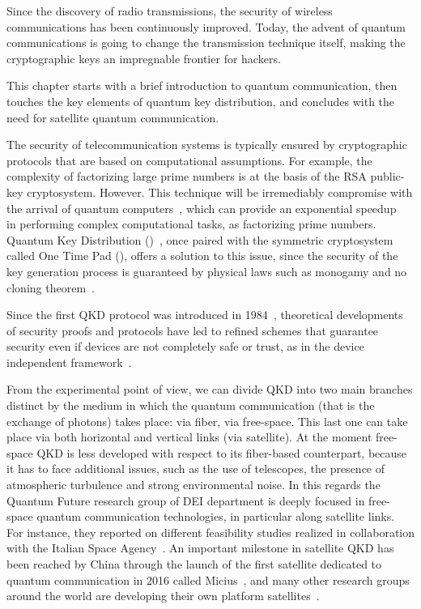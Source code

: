 
Since the discovery of radio transmissions, the security of wireless communications has been continuously improved. Today, the advent of quantum communications is going to change the transmission technique itself, making the cryptographic keys an impregnable frontier for hackers.

This chapter starts with a brief introduction to quantum communication, then touches the key elements of quantum key distribution, and concludes with the need for satellite quantum communication.


\newpage

The security of telecommunication systems is typically ensured by cryptographic protocols that are based on computational assumptions. For example, the complexity of factorizing large prime numbers is at the basis of the RSA public-key cryptosystem. However. This technique will be irremediably compromise with the arrival of quantum computers~\cite{a1,a2,a3}, which can provide an exponential speedup~\cite{a4} in performing complex computational tasks, as factorizing prime numbers. Quantum Key Distribution ()~\cite{a24,a25}, once paired with the symmetric cryptosystem called One Time Pad (), offers a solution to this issue, since the security of the key generation process is guaranteed by physical laws such as monogamy and no cloning theorem~\cite{a5}.

Since the first QKD protocol was introduced in 1984~\cite{a6}, theoretical developments of security proofs and protocols have led to refined schemes that guarantee security even if devices are not completely safe or trust, as in the device independent framework~\cite{a5,a6,a7,a8,a9,a10,a11}.

From the experimental point of view, we can divide QKD into two main branches distinct by the medium in which the quantum communication (that is the exchange of photons) takes place: via fiber, via free-space. This last one can take place via both horizontal and vertical links (via satellite). At the moment free-space QKD is less developed with respect to its fiber-based counterpart, because it has to face additional issues, such as the use of telescopes, the presence of atmospheric turbulence and strong environmental noise. In this regards the Quantum Future research group of DEI department is deeply focused in free-space quantum communication technologies, in particular along satellite links. For instance, they reported on different feasibility studies realized in collaboration with the Italian Space Agency~\cite{a12,a13,a14}. An important milestone in satellite QKD has been reached by China through the launch of the first satellite dedicated to quantum communication in 2016 called Micius~\cite{a15}, and many other research groups around the world are developing their own platform satellites~\cite{a16,a17,a18}.

